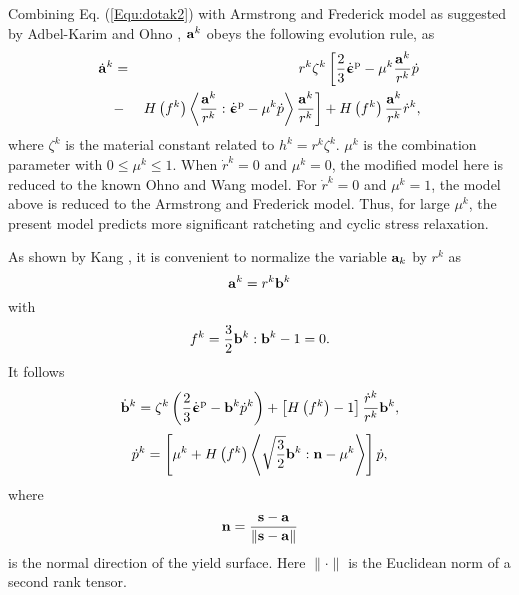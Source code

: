 \documentclass[preprint,5p,twocolumn,11pt,sort&compress]{elsarticle}
\newcommand{\dotbfepsilon}{{\dot{\bm{\upepsilon}}}}
\newcommand{\bfn}{{\bf n}}
\newcommand{\bfa}{{\bf a}}
\newcommand{\bfb}{{\bf b}}
\newcommand{\bfs}{{\bf s}}
\begin{document}
Combining Eq. (\ref{Equ:dotak2}) with Armstrong and Frederick model as suggested by Adbel-Karim and Ohno  \cite{AbdelKarim20051303},  ${\bfa^k}$ obeys the following evolution rule, as
\begin{eqnarray}
\label{Equ:dotak3}
{\dot\bfa^k} &=& {r^k}{\zeta ^k}\left[ \frac{2}{3}{{\dotbfepsilon}^{\rm p}} - {\mu ^k}\frac{\bfa^k}{r^k}\dot p \right.
\\ \nonumber
&-& \left.  H\left( {f^k} \right) \left\langle {\frac{\bfa^k}{r^k}:{\dotbfepsilon}^{\rm p}} - {\mu ^k}\dot p \right\rangle \frac{\bfa^k}{r^k} \right]
+ H\left( {f^k} \right)\frac{\bfa^k}{r^k}{\dot r^k},
\end{eqnarray}
where ${\zeta ^k}$ is the material constant related to ${h^k} = {r^k}{\zeta ^k}$. ${\mu ^k}$ is the combination parameter with $0 \leqslant {\mu ^k} \leqslant 1$. When ${\dot r^k} = 0$ and ${\mu ^k} = 0$, the modified model here is reduced to the known Ohno and Wang model. For ${\dot r^k} = 0$ and ${\mu ^k} = 1$, the  model above is reduced to the Armstrong and Frederick model. Thus, for large ${\mu ^k}$, the present model predicts more significant ratcheting and cyclic stress relaxation.


As shown by Kang \cite{Kang2004299}, it is convenient to normalize the variable $\bfa_k$ by $r^k$ as
\begin{equation}
\label{Equ:ak1}
{\bfa^k} = {r^k}{\bfb^k}
\end{equation}
with
\begin{equation}
{f^k} = \frac{3}{2}{\bfb^k}:{\bfb^k} - 1 = 0.
\end{equation}
It follows
\begin{equation}
{\dot\bfb^k} = {\zeta ^k}\left( {\frac{2}{3}{\dotbfepsilon^{\rm p}} - {\bfb^k}{{\dot p}^k}} \right) + \left[ {H\left( {{f^k}} \right) - 1} \right]\frac{{{{\dot r}^k}}}{{{r^k}}}{\bfb^k},
\end{equation}
\begin{equation}
{\dot p^k} = \left[ {{\mu ^k} + H\left( {{f^k}} \right)\left\langle {\sqrt {\frac{3}{2}} {\bfb^k}:\bfn - {\mu ^k}} \right\rangle } \right]\dot p,
\end{equation}
where
\[\bfn = \frac{{\bfs - \bfa}}{{\left\| {\bfs - \bfa} \right\|}}
\]
is the normal direction of the yield surface. Here $\parallel\cdot\parallel$ is the Euclidean norm of a second rank tensor.
\end{document}
